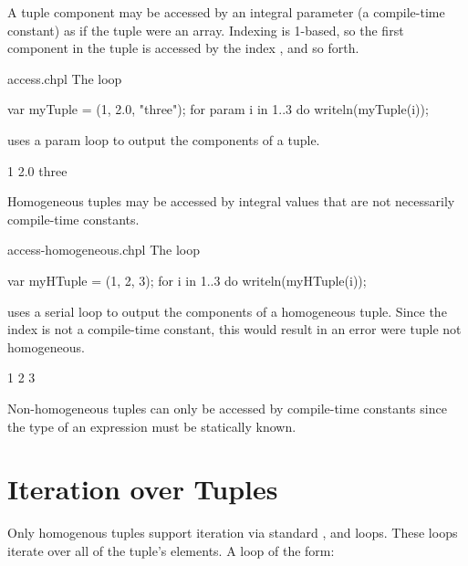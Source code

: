 A tuple component may be accessed by an integral parameter (a compile-time
constant) as if the tuple were an array.  Indexing is 1-based, so the
first component in the tuple is accessed by the index , and so
forth.

\begin{chapelexample}{access.chpl}
The loop
\begin{chapel}
var myTuple = (1, 2.0, "three");
for param i in 1..3 do
  writeln(myTuple(i));
\end{chapel}
uses a param loop to output the components of a tuple.
\begin{chapelpost}
\end{chapelpost}
\begin{chapeloutput}
1
2.0
three
\end{chapeloutput}
\end{chapelexample}

Homogeneous tuples may be accessed by integral values that are not
necessarily compile-time constants.

\begin{chapelexample}{access-homogeneous.chpl}
The loop
\begin{chapel}
var myHTuple = (1, 2, 3);
for i in 1..3 do
  writeln(myHTuple(i));
\end{chapel}
uses a serial loop to output the components of a homogeneous tuple.
Since the index is not a compile-time constant, this would result in
an error were tuple not homogeneous.
\begin{chapelpost}
\end{chapelpost}
\begin{chapeloutput}
1
2
3
\end{chapeloutput}
\end{chapelexample}

\begin{rationale}
Non-homogeneous tuples can only be accessed by compile-time constants
since the type of an expression must be statically known.
\end{rationale}

\section{Iteration over Tuples}
\label{Iteration_over_Tuples}

Only homogenous tuples support iteration via
standard ,  and  loops.  These loops
iterate over all of the tuple's elements.  A loop of the form:

